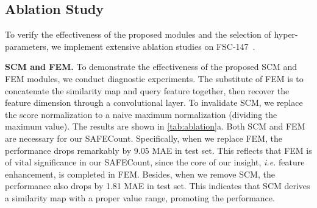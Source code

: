 \documentclass[10pt,twocolumn,letterpaper]{article}
\newcommand{\method}{SAFECount\xspace}
\begin{document}
\subsection{Ablation Study} \label{subsec:ablation}
To verify the effectiveness of the proposed modules and the selection of hyper-parameters, we implement extensive ablation studies on FSC-147~\cite{famnet}. 

\vspace{2pt}\noindent \textbf{SCM and FEM.} 
To demonstrate the effectiveness of the proposed SCM and FEM modules, we conduct diagnostic experiments. 
The substitute of FEM is to concatenate the similarity map and query feature together, then recover the feature dimension through a  convolutional layer. 
To invalidate SCM, we replace the score normalization to a naive maximum normalization (dividing the maximum value). 
The results are shown in \cref{tab:ablation}a. 
Both SCM and FEM are necessary for our \method. 
Specifically, when we replace FEM, the performance drops remarkably by 9.05 MAE in test set. 
This reflects that FEM is of vital significance in our \method, since the core of our insight, \textit{i.e.} feature enhancement, is completed in FEM. 
Besides, when we remove SCM, the performance also drops by 1.81 MAE in test set. 
This indicates that SCM derives a similarity map with a proper value range, promoting the performance. 
\end{document}
